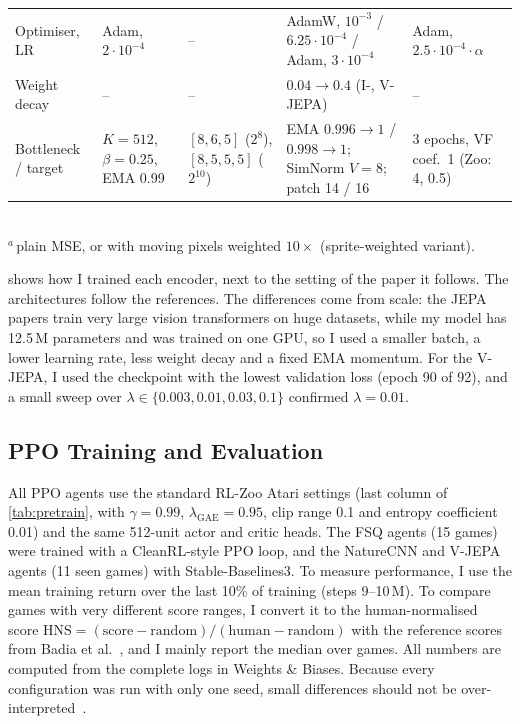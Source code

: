 \documentclass[runningheads]{llncs}
\begin{document}
\begin{table}[t]
\begin{tabular}{@{}Y{1.6cm}Y{2.25cm}Y{2.2cm}Y{2.95cm}Y{2.25cm}@{}}
Optimiser, LR & Adam, $2{\cdot}10^{-4}$ & -- & AdamW, $10^{-3}$ / $6.25{\cdot}10^{-4}$ / Adam, $3{\cdot}10^{-4}$ &
  Adam, $2.5{\cdot}10^{-4}\cdot\alpha$ \\
Weight decay & -- & -- & $0.04\to0.4$ (I-, V-JEPA) & -- \\
Bottleneck / target & $K{=}512$, $\beta{=}0.25$, EMA 0.99 & $[8,6,5]$ ($2^8$), $[8,5,5,5]$ ($2^{10}$) &
  EMA $0.996\to1$ / $0.998\to1$; SimNorm $V{=}8$; patch 14 / 16 & 3 epochs, VF coef.\ 1 (Zoo: 4, 0.5) \\
\bottomrule
\end{tabular}\\[2pt]
{\scriptsize $^{a}$\,plain MSE, or with moving pixels weighted $10\times$ (sprite-weighted variant).}
\end{table}

 shows how I trained each encoder, next to the setting of the paper it
follows. The architectures follow the references. The differences come from scale: the JEPA
papers train very large vision transformers on huge datasets, while my model has 12.5\,M
parameters and was trained on one GPU, so I used a smaller batch, a lower learning rate, less
weight decay and a fixed EMA momentum. For the V-JEPA, I used the checkpoint with the lowest
validation loss (epoch 90 of 92), and a small sweep over $\lambda\in\{0.003,0.01,0.03,0.1\}$
confirmed $\lambda=0.01$.

\subsection{PPO Training and Evaluation}

All PPO agents use the standard RL-Zoo Atari settings (last column of \cref{tab:pretrain},
with $\gamma=0.99$, $\lambda_{\text{GAE}}=0.95$, clip range 0.1 and entropy coefficient 0.01)
and the same 512-unit actor and critic heads. The FSQ agents (15 games) were trained with a
CleanRL-style PPO loop, and the NatureCNN and V-JEPA agents (11 seen games) with
Stable-Baselines3. To measure performance, I use the mean training return over the last 10\%
of training (steps 9--10\,M). To compare games with very different score ranges, I convert it to
the human-normalised score HNS$=(\text{score}-\text{random})/(\text{human}-\text{random})$ with
the reference scores from Badia et al.~\cite{badia2020agent57}, and I mainly report the median
over games. All numbers are computed from the complete logs in Weights \& Biases. Because every
configuration was run with only one seed, small differences should not be over-interpreted~\cite{agarwal2021precipice}.
\end{document}
